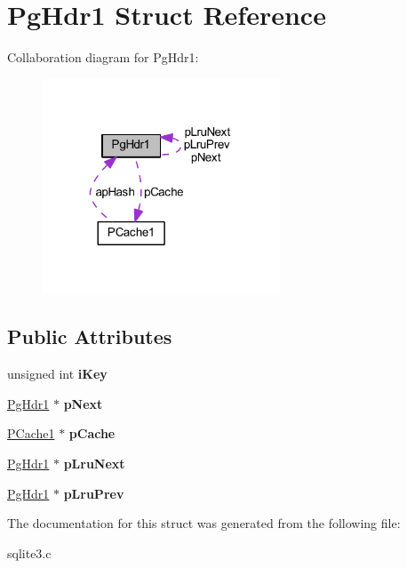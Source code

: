 \hypertarget{struct_pg_hdr1}{\section{Pg\-Hdr1 Struct Reference}
\label{struct_pg_hdr1}
}


Collaboration diagram for Pg\-Hdr1\-:\nopagebreak
\begin{figure}[H]
\begin{center}
\leavevmode
\includegraphics[width=200pt]{struct_pg_hdr1__coll__graph}
\end{center}
\end{figure}
\subsection*{Public Attributes}
\begin{DoxyCompactItemize}
\item 
\hypertarget{struct_pg_hdr1_ad122ef74f5f0137414882aabd111a01b}{unsigned int {\bfseries i\-Key}}\label{struct_pg_hdr1_ad122ef74f5f0137414882aabd111a01b}

\item 
\hypertarget{struct_pg_hdr1_acde43ab0ed0fbba33e526058d9c343b9}{\hyperlink{struct_pg_hdr1}{Pg\-Hdr1} $\ast$ {\bfseries p\-Next}}\label{struct_pg_hdr1_acde43ab0ed0fbba33e526058d9c343b9}

\item 
\hypertarget{struct_pg_hdr1_aa5b23de466773e72e1b6edf07b3a4570}{\hyperlink{struct_p_cache1}{P\-Cache1} $\ast$ {\bfseries p\-Cache}}\label{struct_pg_hdr1_aa5b23de466773e72e1b6edf07b3a4570}

\item 
\hypertarget{struct_pg_hdr1_ae22cfc3a39fe029a8f8fdd70e7ca4055}{\hyperlink{struct_pg_hdr1}{Pg\-Hdr1} $\ast$ {\bfseries p\-Lru\-Next}}\label{struct_pg_hdr1_ae22cfc3a39fe029a8f8fdd70e7ca4055}

\item 
\hypertarget{struct_pg_hdr1_adf220ef63d6ceb782ac87a08aeb1722d}{\hyperlink{struct_pg_hdr1}{Pg\-Hdr1} $\ast$ {\bfseries p\-Lru\-Prev}}\label{struct_pg_hdr1_adf220ef63d6ceb782ac87a08aeb1722d}

\end{DoxyCompactItemize}


The documentation for this struct was generated from the following file\-:\begin{DoxyCompactItemize}
\item 
sqlite3.\-c\end{DoxyCompactItemize}
